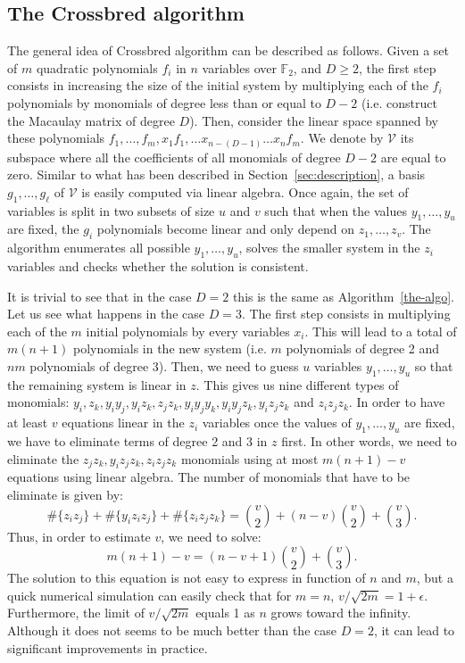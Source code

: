 \documentclass[a4paper,UKenglish,cleveref, autoref]{lipics-v2019}
\begin{document}
	
	\subsection{The \textsf{Crossbred} algorithm}\label{sec:JV}
	
	The general idea of \textsf{Crossbred} algorithm can be described as follows.
	Given a set of $m$ quadratic polynomials $f_i$ in $n$ variables over $\mathbb{F}_2$, 
	and $D \geq 2$, the first step consists in
	increasing the size of the initial system by multiplying each of the $f_i$
	polynomials by monomials of degree less than or equal to $D-2$ 
	(i.e. construct the Macaulay matrix of degree $D$).
	Then, consider the linear space spanned 
	by these polynomials $f_1, \dots, f_m, x_1f_1, \dots x_{n-(D-1)}\dots x_{n}f_m$. 
	We denote by $\mathcal{V}$ its subspace where all the coefficients of all 
	monomials of degree $D -2$ are equal to zero. Similar to what has been 
	described in Section~\ref{sec:description}, a basis $g_1, \dots, g_\ell$ of
	$\mathcal{V}$ is easily computed via linear algebra. Once again, the set of variables
	is split in two subsets of size $u$ and $v$ such that when the values $y_1, \dots, y_u$
	are fixed, the $g_i$ polynomials become linear and only depend on $z_1, \dots, z_v$.
	The algorithm enumerates all possible $y_1, \dots, y_u$, solves the smaller system in the $z_i$
	variables and checks whether the solution is consistent.
	
	It is trivial to see that in the case $D=2$ this is the same as Algorithm~\ref{the-algo}.
	Let us see what happens in the case $D=3$. The first step consists in multiplying each of
	the $m$ initial polynomials by every variables $x_i$. This will lead to a total of
	$m(n+1)$ polynomials in the new system (i.e. $m$ polynomials of degree 2 and $nm$ polynomials
	of degree 3). Then, we need to guess $u$ variables $y_1, \dots, y_u$ so that the remaining system
	is linear in $z$. This gives us nine different types of monomials:
	$y_i, z_k, y_iy_j, y_iz_k, z_jz_k, y_iy_jy_k, y_iy_jz_k, y_iz_jz_k$ and $z_iz_jz_k$.
	In order to have at least $v$ equations linear in the $z_i$ variables once the values of $y_1, \dots, y_u$
	are fixed, we have to eliminate terms of degree 2 and 3 in $z$ first. In other words,
	we need to eliminate the $z_jz_k, y_iz_jz_k, z_iz_jz_k$ monomials using at most $m(n+1) - v$ equations
	using linear algebra. The number of monomials that have to be eliminate is given by:
	\[
	\#\{z_iz_j\} + \#\{y_iz_iz_j\} +\#\{z_iz_jz_k\}
	= \binom{v}{2} + (n-v)\binom{v}{2} +\binom{v}{3}.
	\]
	Thus, in order to estimate $v$, we need to solve:
	\[
	m(n+1) -v = (n-v +1)\binom{v}{2} + \binom{v}{3}.
	\]
	The solution to this equation is not easy to express in function of $n$ and $m$, but a quick
	numerical simulation can easily check that for $m=n$, $v/\sqrt{2m} = 1+\epsilon$. Furthermore,
	the limit of $v/\sqrt{2m}$ equals 1 as $n$ grows toward the infinity. Although it does not seems
	to be much better than the case $D=2$, it can lead to significant improvements in
	practice.
	
\end{document}
